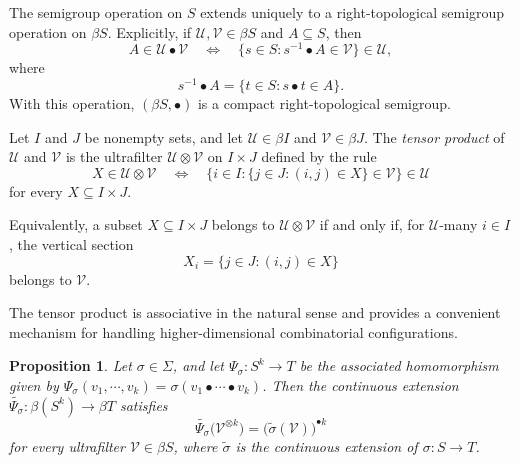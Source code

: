 \documentclass[12pt]{amsart}
\newtheorem{prop}{Proposition}
\begin{document}
The semigroup operation on $S$ extends uniquely to a right-topological semigroup operation on $\beta S$. Explicitly, if $\mathcal{U},\mathcal{V}\in\beta S$ and $A\subseteq S$, then
\[
A\in\mathcal{U}\bullet\mathcal{V}
\quad\Longleftrightarrow\quad
\{s\in S:s^{-1}\bullet A\in\mathcal{V}\}\in\mathcal{U},
\]
where
\[
s^{-1}\bullet A=\{t\in S:s\bullet t\in A\}.
\]
With this operation, $(\beta S,\bullet)$ is a compact right-topological semigroup.




Let $I$ and $J$ be nonempty sets, and let $\mathcal{U}\in\beta I$ and $\mathcal{V}\in\beta J$. The \emph{tensor product} of $\mathcal{U}$ and $\mathcal{V}$ is the ultrafilter $\mathcal{U}\otimes\mathcal{V}$ on $I\times J$ defined by the rule
\[
X\in\mathcal{U}\otimes\mathcal{V}
\quad\Longleftrightarrow\quad
\{i\in I:\{j\in J:(i,j)\in X\}\in\mathcal{V}\}\in\mathcal{U}
\]
for every $X\subseteq I\times J$.

Equivalently, a subset $X\subseteq I\times J$ belongs to $\mathcal{U}\otimes\mathcal{V}$ if and only if, for $\mathcal{U}$-many $i\in I$, the vertical section
\[
X_i=\{j\in J:(i,j)\in X\}
\]
belongs to $\mathcal{V}$.

The tensor product is associative in the natural sense and provides a convenient mechanism for handling higher-dimensional combinatorial configurations. 



\begin{prop}\label{pindultra}
Let $\sigma\in \Sigma$, and let $\Psi_\sigma:S^k\to T$ be the associated homomorphism given by $\Psi_\sigma(v_1, \cdots , v_k)= \sigma(v_1\bullet \cdots \bullet v_k)$. Then the continuous extension $\widetilde{\Psi_\sigma}:\beta(S^k)\to \beta T$
satisfies
\[
\widetilde{\Psi_\sigma}\bigl(\mathcal{V}^{\otimes k}\bigr)
   =\bigl(\widetilde{\sigma}(\mathcal{V})\bigr)^{\bullet k}
\]
for every ultrafilter $\mathcal{V}\in \beta S$, where $\widetilde{\sigma}$ is the continuous extension of $\sigma: S \rightarrow T$.
\end{prop}
\end{document}
